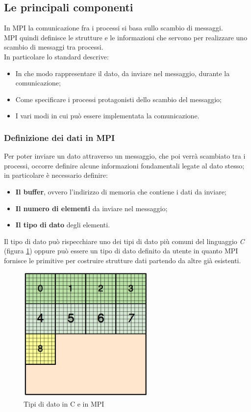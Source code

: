 \subsection{Le principali componenti}\label{subsec:comm_mpi}
In MPI la comunicazione fra i processi si basa sullo scambio di messaggi.\\
MPI quindi definisce le strutture e le informazioni che servono per realizzare uno scambio di messaggi tra processi.\\
In particolare lo standard descrive:
\begin{itemize}
	\item In che modo rappresentare il dato, da inviare nel messaggio, durante la comunicazione;
	\item Come specificare i processi protagonisti dello scambio del messaggio;
	\item I vari modi in cui può essere implementata la comunicazione.
\end{itemize}  
\subsubsection{Definizione dei dati in MPI}\label{subsec:def_dati_mpi}
Per poter inviare un dato attraverso un messaggio, che poi verrà scambiato tra i processi, occorre definire alcune informazioni fondamentali legate al dato stesso; in particolare è necessario definire:
\begin{itemize}
	\item \textbf{Il buffer}, ovvero l'indirizzo di memoria che contiene i dati da inviare;
	\item \textbf{Il numero di elementi} da inviare nel messaggio;
	\item \textbf{Il tipo di dato} degli elementi.
\end{itemize}
Il tipo di dato può rispecchiare uno dei tipi di dato più comuni del linguaggio \textit{C} (figura \ref{fig:mpi_data_types}) oppure può essere un tipo di dato definito da utente in quanto MPI fornisce le primitive per costruire strutture dati partendo da altre già esistenti.
\begin{figure}[H]
	\centering
	\includegraphics[width=0.6\textwidth]{immagini/block_on_grid.png}
	\caption{Tipi di dato in C e in MPI}
	\label{fig:mpi_data_types}
\end{figure}
